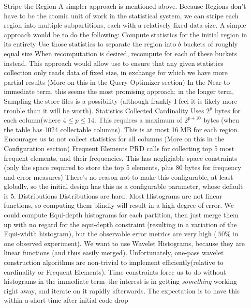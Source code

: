 \documentclass[10pt]{amsart}
\begin{document}
\begin{outline}[enumerate]
	\2 Stripe the Region
		\3[*] A simpler approach is mentioned above. Because Regions don't have to be the atomic unit of work in the statistical system, we can stripe each region into multiple subpartitions, each with a relatively fixed data size. A simple approach would be to do the following:
			\4 Compute statistics for the initial region in its entirety
			\4 Use those statistics to separate the region into $b$ buckets of roughly equal size
			\4 When recomputation is desired, recompute for each of these buckets instead.
		\3[] This approach would allow use to ensure that any given statistics collection only reads data of fixed size, in exchange for which we have more partial results (More on this in the Query Optimizer section)
		\3[*] In the Near-to immediate term, this seems the most promising approach; in the longer term, Sampling the store files is a possibility (although frankly I feel it is likely more trouble than it will be worth).
\1 Statistics Collected
	\2 Cardinality
		\3 Uses $2^p$ bytes for each column(where $4\leq p \leq 14$. This requires a maximum of $2^{p+10}$ bytes (when the table has 1024 collectable columns). This is at most 16 MB for each region.
			\4[*] Encourages us to not collect statistics for all columns (More on this in the Configuration section)
	\2 Frequent Elements
		\3 PRD calls for collecting top 5 most frequent elements, and their frequencies. This has negligiable space constraints (only the space required to store the top 5 elements, plus 80 bytes for frequency and error measures)
			\4[*] There's no reason not to make this configurable, at least globally, so the initial design has this as a configurable parameter, whose default is 5.
	\2 Distributions
		\3 Distributions are hard. Most Histograms are not linear functions, so computing them blindly will result in a high degree of error. 
			\4[*]We could compute Equi-depth histograms for each partition, then just merge them up with no regard for the equi-depth constraint (resulting in a variation of the Equi-width histogram), but the observable error metrics are very high ($\>50\%$ in one observed experiment). 
			\4[*] We want to use Wavelet Histograms, because they are linear functions (and thus easily merged). Unfortunately, one-pass wavelet construction algorithms are non-trivial to implement efficiently(relative to cardinality or Frequent Elements).
		\3 Time constraints force us to do without histograms in the immediate term--the interest is in getting \emph{something} working right away, and iterate on it rapidly afterwards. The expectation is to have this within a short time after initial code drop
\end{outline}
\end{document}
